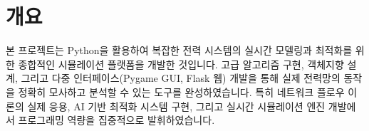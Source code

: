 \section{개요}

 본 프로젝트는 Python을 활용하여 복잡한 전력 시스템의 실시간 모델링과 최적화를 위한 종합적인 시뮬레이션 플랫폼을 개발한 것입니다. 고급 알고리즘 구현, 객체지향 설계, 그리고 다중 인터페이스(Pygame GUI, Flask 웹) 개발을 통해 실제 전력망의 동작을 정확히 모사하고 분석할 수 있는 도구를 완성하였습니다. 특히 네트워크 플로우 이론의 실제 응용, AI 기반 최적화 시스템 구현, 그리고 실시간 시뮬레이션 엔진 개발에서 프로그래밍 역량을 집중적으로 발휘하였습니다. 